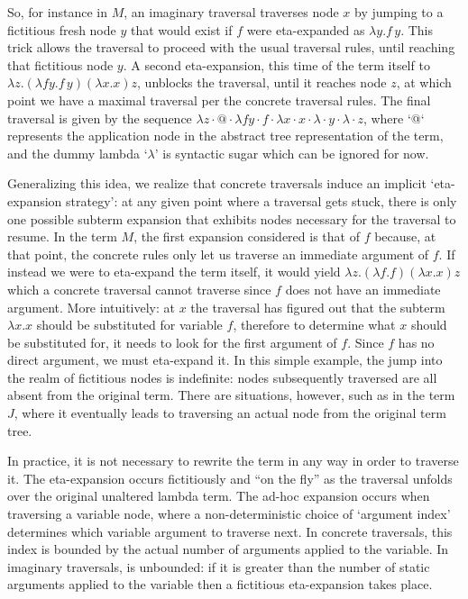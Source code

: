 \documentclass{elsarticle}
\theoremstyle{plain}
\theoremstyle{definition}
\begin{document}
So, for instance in $M$, an imaginary traversal traverses node $x$ by jumping to a fictitious fresh node $y$ that would exist if $f$ were eta-expanded
as $\lambda y.f\, y$. This trick allows the traversal to proceed with the usual traversal rules, until reaching that fictitious node $y$.
A second eta-expansion, this time of the term itself to
$\lambda z. (\lambda f y.f\, y)(\lambda x.x) z$,
unblocks the traversal, until it reaches node $z$, at which point we have a maximal traversal per the concrete traversal rules. The final traversal is given by the sequence $\lambda z \cdot @ \cdot \lambda f y \cdot f \cdot \lambda x \cdot x \cdot \lambda \cdot y \cdot \lambda \cdot z$, where `@` represents the application node in the abstract tree representation of the term, and the dummy lambda `$\lambda$' is syntactic sugar which can be ignored for now.

Generalizing this idea, we realize that concrete traversals induce an implicit `eta-expansion strategy': at any given point where a traversal gets stuck, there is only one possible subterm expansion that exhibits nodes necessary for the traversal to resume. In the term $M$, the first expansion considered is that of $f$ because, at that point, the concrete rules only let us
traverse an immediate argument of $f$. If instead we were to eta-expand the term itself, it would yield $\lambda z. (\lambda f .f)(\lambda x.x) z$
which a concrete traversal cannot traverse since $f$ does not have an immediate argument. More intuitively: at $x$ the traversal has figured out that the subterm $\lambda x.x$ should be substituted for variable $f$, therefore to determine what $x$ should be substituted for, it needs to look for the first argument of $f$. Since $f$ has no direct argument, we must eta-expand it. In this simple example, the jump into the realm of fictitious nodes is indefinite: nodes subsequently traversed are all absent from the original term. There are situations, however, such as in the term $J$, where it eventually leads to traversing an actual node from the original term tree.

In practice, it is not necessary to rewrite the term in any way in order to traverse it.
The eta-expansion occurs fictitiously and ``on the fly'' as the traversal unfolds over the original unaltered lambda term.
The ad-hoc expansion occurs when traversing a variable node, where a non-deterministic choice of `argument index' determines which variable argument to traverse next. In concrete traversals, this index is bounded by the actual number of arguments applied to the variable. In imaginary traversals, is unbounded: if it is greater than the number of static arguments applied to the variable then a fictitious eta-expansion takes place.
\end{document}
